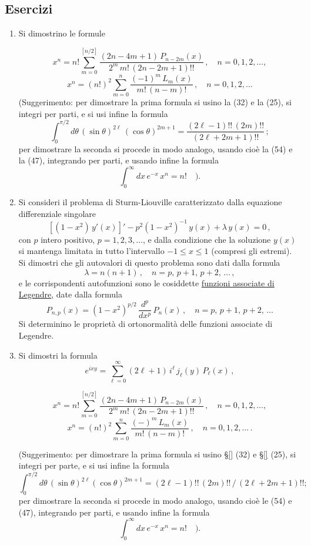 \documentclass[11pt, a4paper]{book}
\numberwithin{equation}{section}
\newenvironment{esercizi}{\subsection*{Esercizi}\begin{enumerate}}{\end{enumerate}}
\begin{document}
\begin{esercizi}
\begin{enumerate}
\item[14.] Si dimostrino le formule


\[
x^n = n! \sum_{m=0}^{[n/2]} \frac{(2n-4m+1)\, P_{n-2m}(x)}{2^m\, m!\, (2n-2m+1)!!} \,, \quad n=0,1,2,\ldots,
\]
\[
x^n = (n!)^2 \sum_{m=0}^{n} \frac{(-1)^m\, L_m(x)}{m!\,(n-m)!} \,, \quad n=0,1,2,\ldots
\]
(Suggerimento: per dimostrare la prima formula si usino la (32) e
la (25), si integri per parti, e si usi infine la formula
\[
\int_0^{\pi/2} d\theta\, (\sin\theta)^{2\ell}\, (\cos\theta)^{2m+1} = \frac{(2\ell-1)!!\,(2m)!!}{(2\ell+2m+1)!!} \,;
\]
per dimostrare la seconda si procede in modo analogo, usando
cioè la (54) e la (47), integrando per parti, e usando infine la formula
\[
\int_0^{\infty} dx\, e^{-x}\, x^n = n! \quad ).
\]

\item[15.] Si consideri il problema di Sturm-Liouville caratterizzato dalla
equazione differenziale singolare
\[
\left[(1-x^2)\, y'(x)\right]' - p^2(1-x^2)^{-1}\, y(x) + \lambda\, y(x) = 0 \,,
\]
con $p$ intero positivo, $p=1,2,3,\ldots$, e dalla condizione che la soluzione $y(x)$ si mantenga limitata in tutto l'intervallo $-1 \leq x \leq 1$
(compresi gli estremi). Si dimostri che gli autovalori di questo
problema sono dati dalla formula
\[
\lambda = n(n+1) \,, \quad n = p,\, p+1,\, p+2,\, \ldots\,,
\]
e le corrispondenti autofunzioni sono le cosiddette \underline{funzioni associate
di Legendre}, date dalla formula
\[
P_{n,p}(x) = (1-x^2)^{p/2}\, \frac{d^p}{dx^p}\, P_n(x) \,, \quad n = p,\, p+1,\, p+2,\, \ldots
\]
Si determinino le proprietà di ortonormalità delle funzioni associate
di Legendre.

\item[16.] Si dimostri la formula
\[
e^{ixy} = \sum_{\ell=0}^{\infty} (2\ell+1)\, i^\ell\, j_\ell(y)\, P_\ell(x) \,,
\]

\[
x^n = n!\sum_{m=0}^{[n/2]} \frac{(2n-4m+1)\, P_{n-2m}(x)}{2^m\, m!\, (2n-2m+1)!!}\,, \quad n=0,1,2,\ldots,
\] 
\[
x^n = (n!)^2 \sum_{m=0}^{n} \frac{(-)^m\, L_m(x)}{m!\,(n-m)!}\,, \quad n=0,1,2,\ldots\,.
\]

(Suggerimento: per dimostrare la prima formula si usino \S\ref{} (32)
e \S\ref{} (25), si integri per parte, e si usi infine la formula
\[
\int_0^{\pi/2} d\theta\, (\sin\theta)^{2\ell}(\cos\theta)^{2m+1}
= (2\ell-1)!!\,(2m)!!\,/\,(2\ell+2m+1)!!;
\]
per dimostrare la seconda si procede in modo analogo, usando cioè le (54) e (47), integrando per parti, e usando infine la formula
\[
\int_0^{\infty} dx\, e^{-x}\, x^n = n!\quad ).
\]


\end{enumerate}
\end{esercizi}
\end{document}
